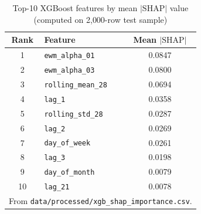 \begin{table}[H]
\centering
\caption{Top-10 XGBoost features by mean $|\text{SHAP}|$ value (computed on 2{,}000-row test sample)}
\label{tab:shap}
\begin{tabular}{@{}clc@{}}
\toprule
\textbf{Rank} & \textbf{Feature} & \textbf{Mean $|\text{SHAP}|$} \\
\midrule
1 & \texttt{ewm\_alpha\_01} & 0.0847 \\
2 & \texttt{ewm\_alpha\_03} & 0.0800 \\
3 & \texttt{rolling\_mean\_28} & 0.0694 \\
4 & \texttt{lag\_1} & 0.0358 \\
5 & \texttt{rolling\_std\_28} & 0.0287 \\
6 & \texttt{lag\_2} & 0.0269 \\
7 & \texttt{day\_of\_week} & 0.0261 \\
8 & \texttt{lag\_3} & 0.0198 \\
9 & \texttt{day\_of\_month} & 0.0079 \\
10 & \texttt{lag\_21} & 0.0078 \\
\bottomrule
\multicolumn{3}{l}{\footnotesize From \texttt{data/processed/xgb\_shap\_importance.csv}.}
\end{tabular}
\end{table}
